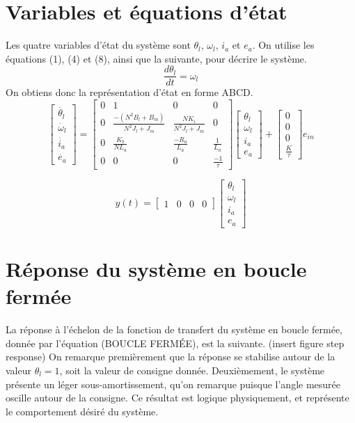 \documentclass{udes_rapport} %
\begin{document}
\section{Variables et équations d'état}
Les quatre variables d'état du système sont $\theta_l$, $\omega_l$, $i_a$ et $e_a$.
On utilise les équations (1), (4) et (8), ainsi que la suivante, pour décrire le système.
\begin{equation}
\frac{d\theta_l}{dt} = \omega_l
\end{equation}
On obtiens donc la représentation d'état en forme ABCD.
\
$$
\begin{bmatrix}
\dot{\theta_l} \\
\dot{\omega_l} \\
\dot{i_a} \\
\dot{e_a} 
\end{bmatrix}
=
\begin{bmatrix}
0 & 1 & 0 & 0 \\
0 & \frac{-(N^2B_l + B_m)}{N^2J_l + J_m} & \frac{NK_i}{N^2J_l + J_m} & 0 \\
0 & \frac{K_b}{NL_a} & \frac{-R_a}{L_a} & \frac{1}{L_a} \\
0 & 0 & 0 & \frac{-1}{\tau}
\end{bmatrix}
\begin{bmatrix}
\theta_l \\
\omega_l \\
i_a \\
e_a 
\end{bmatrix}
+
\begin{bmatrix}
0 \\
0\\
0\\
\frac{K}{\tau}
\end{bmatrix} 
e_{in}
$$

$$
y(t) = 
\begin{bmatrix}
1 & 0 & 0 & 0
\end{bmatrix} 
\begin{bmatrix}
\theta_l \\ \omega_l \\ i_a \\ e_a
\end{bmatrix} 
$$

\section{Réponse du système en boucle fermée}

La réponse à l'échelon de la fonction de transfert du système en boucle fermée, donnée par l'équation (BOUCLE FERMÉE), est la suivante.
(insert figure step response)
On remarque premièrement que la réponse se stabilise autour de la valeur $\theta_l = 1$, soit la valeur de consigne donnée.
Deuxièmement, le système présente un léger sous-amortissement, qu'on remarque puisque l'angle mesurée oscille autour de la consigne.
Ce résultat est logique physiquement, et représente le comportement désiré du système.
\end{document}

